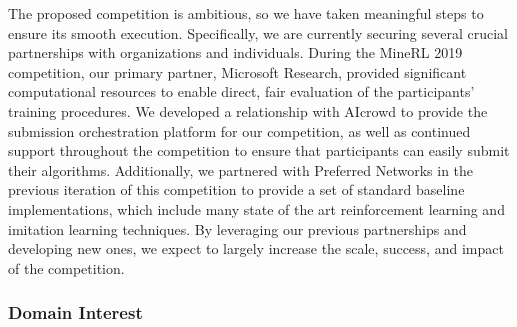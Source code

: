 The proposed competition is ambitious, so we have taken meaningful steps to ensure its smooth execution. 
Specifically, we are currently securing several crucial partnerships with organizations and individuals. 
During the MineRL 2019 competition, our primary partner, Microsoft Research, provided significant computational resources to enable direct, fair evaluation of the participants' training procedures. 
We developed a relationship with AIcrowd to provide the submission orchestration platform for our competition, as well as continued support throughout the competition to ensure that participants can easily submit their algorithms. Additionally, we partnered with Preferred Networks in the previous iteration of this competition to provide a set of standard baseline implementations, which include many state of the art reinforcement learning and imitation learning techniques. By leveraging our previous partnerships and developing new ones, we expect to largely increase the scale, success, and impact of the competition.




\subsubsection{Domain Interest}

